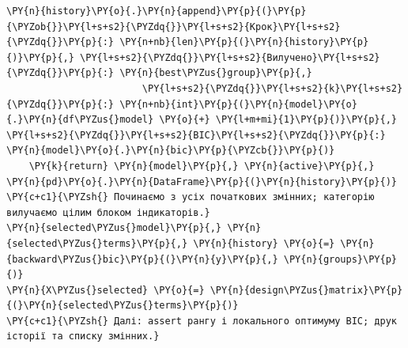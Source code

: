 \begin{Verbatim}[commandchars=\\\{\}]
        \PY{n}{history}\PY{o}{.}\PY{n}{append}\PY{p}{(}\PY{p}{\PYZob{}}\PY{l+s+s2}{\PYZdq{}}\PY{l+s+s2}{Крок}\PY{l+s+s2}{\PYZdq{}}\PY{p}{:} \PY{n+nb}{len}\PY{p}{(}\PY{n}{history}\PY{p}{)}\PY{p}{,} \PY{l+s+s2}{\PYZdq{}}\PY{l+s+s2}{Вилучено}\PY{l+s+s2}{\PYZdq{}}\PY{p}{:} \PY{n}{best\PYZus{}group}\PY{p}{,}
                        \PY{l+s+s2}{\PYZdq{}}\PY{l+s+s2}{k}\PY{l+s+s2}{\PYZdq{}}\PY{p}{:} \PY{n+nb}{int}\PY{p}{(}\PY{n}{model}\PY{o}{.}\PY{n}{df\PYZus{}model} \PY{o}{+} \PY{l+m+mi}{1}\PY{p}{)}\PY{p}{,} \PY{l+s+s2}{\PYZdq{}}\PY{l+s+s2}{BIC}\PY{l+s+s2}{\PYZdq{}}\PY{p}{:} \PY{n}{model}\PY{o}{.}\PY{n}{bic}\PY{p}{\PYZcb{}}\PY{p}{)}
    \PY{k}{return} \PY{n}{model}\PY{p}{,} \PY{n}{active}\PY{p}{,} \PY{n}{pd}\PY{o}{.}\PY{n}{DataFrame}\PY{p}{(}\PY{n}{history}\PY{p}{)}
\PY{c+c1}{\PYZsh{} Починаємо з усіх початкових змінних; категорію вилучаємо цілим блоком індикаторів.}
\PY{n}{selected\PYZus{}model}\PY{p}{,} \PY{n}{selected\PYZus{}terms}\PY{p}{,} \PY{n}{history} \PY{o}{=} \PY{n}{backward\PYZus{}bic}\PY{p}{(}\PY{n}{y}\PY{p}{,} \PY{n}{groups}\PY{p}{)}
\PY{n}{X\PYZus{}selected} \PY{o}{=} \PY{n}{design\PYZus{}matrix}\PY{p}{(}\PY{n}{selected\PYZus{}terms}\PY{p}{)}
\PY{c+c1}{\PYZsh{} Далі: assert рангу і локального оптимуму BIC; друк історії та списку змінних.}
\end{Verbatim}
